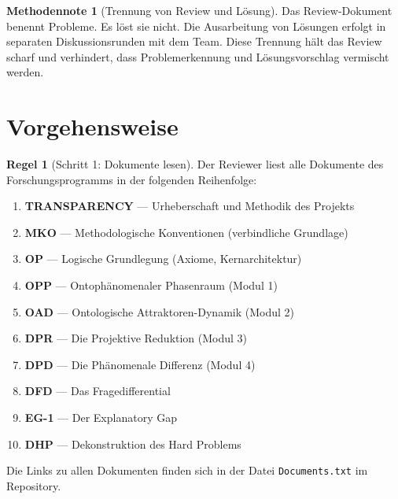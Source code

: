 \documentclass[11pt,a4paper]{article}
\theoremstyle{definition}
\newtheorem{regel}{Regel}[section]
\newtheorem{methodennote}{Methodennote}[section]
\begin{document}
\begin{methodennote}[Trennung von Review und L\"{o}sung]
Das Review-Dokument benennt Probleme. Es l\"{o}st sie nicht. Die Ausarbeitung von
L\"{o}sungen erfolgt in separaten Diskussionsrunden mit dem Team. Diese Trennung h\"{a}lt
das Review scharf und verhindert, dass Problemerkennung und L\"{o}sungsvorschlag
vermischt werden.
\end{methodennote}

\section{Vorgehensweise}

\begin{regel}[Schritt 1: Dokumente lesen]
Der Reviewer liest alle Dokumente des Forschungsprogramms in der folgenden Reihenfolge:

\begin{enumerate}
  \item \textbf{TRANSPARENCY} --- Urheberschaft und Methodik des Projekts
  \item \textbf{MKO} --- Methodologische Konventionen (verbindliche Grundlage)
  \item \textbf{OP} --- Logische Grundlegung (Axiome, Kernarchitektur)
  \item \textbf{OPP} --- Ontoph\"{a}nomenaler Phasenraum (Modul 1)
  \item \textbf{OAD} --- Ontologische Attraktoren-Dynamik (Modul 2)
  \item \textbf{DPR} --- Die Projektive Reduktion (Modul 3)
  \item \textbf{DPD} --- Die Ph\"{a}nomenale Differenz (Modul 4)
  \item \textbf{DFD} --- Das Fragedifferential
  \item \textbf{EG-1} --- Der Explanatory Gap
  \item \textbf{DHP} --- Dekonstruktion des Hard Problems
\end{enumerate}

Die Links zu allen Dokumenten finden sich in der Datei \texttt{Documents.txt} im
Repository.
\end{regel}
\end{document}
